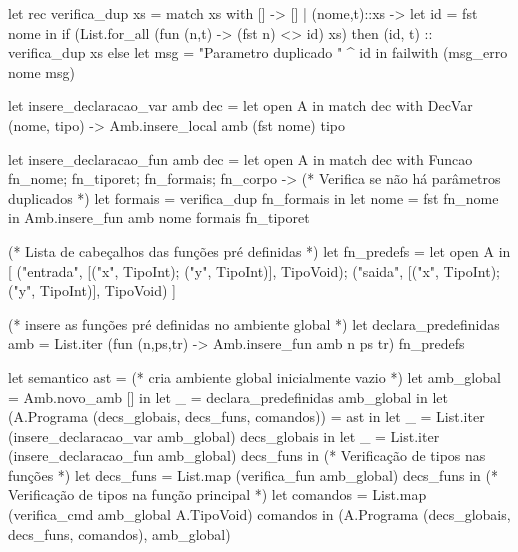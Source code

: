 \documentclass[12pt,a4paper,twoside]{article}
\begin{document}
\begin{terminal}
let rec verifica_dup xs =
  match xs with
    [] -> []
  | (nome,t)::xs ->
    let id = fst nome in
    if (List.for_all (fun (n,t) -> (fst n) <> id) xs)
    then (id, t) :: verifica_dup xs
    else let msg = "Parametro duplicado " ^ id in
      failwith (msg_erro nome msg)

let insere_declaracao_var amb dec =
  let open A in
    match dec with
        DecVar (nome, tipo) ->  Amb.insere_local amb (fst nome) tipo

let insere_declaracao_fun amb dec =
  let open A in
    match dec with
      Funcao {fn_nome; fn_tiporet; fn_formais; fn_corpo} ->
        (* Verifica se não há parâmetros duplicados *)
        let formais = verifica_dup fn_formais in
        let nome = fst fn_nome in
        Amb.insere_fun amb nome formais fn_tiporet


(* Lista de cabeçalhos das funções pré definidas *)
let fn_predefs = let open A in [
   ("entrada", [("x", TipoInt); ("y", TipoInt)], TipoVoid);
   ("saida",   [("x", TipoInt); ("y", TipoInt)], TipoVoid)
]

(* insere as funções pré definidas no ambiente global *)
let declara_predefinidas amb =
  List.iter (fun (n,ps,tr) -> Amb.insere_fun amb n ps tr) fn_predefs

let semantico ast =
  (* cria ambiente global inicialmente vazio *)
  let amb_global = Amb.novo_amb [] in
  let _ = declara_predefinidas amb_global in
  let (A.Programa (decs_globais, decs_funs, comandos)) = ast in
  let _ = List.iter (insere_declaracao_var amb_global) decs_globais in
  let _ = List.iter (insere_declaracao_fun amb_global) decs_funs in
  (* Verificação de tipos nas funções *)
  let decs_funs = List.map (verifica_fun amb_global) decs_funs in
  (* Verificação de tipos na função principal *)
  let comandos = List.map (verifica_cmd amb_global A.TipoVoid) comandos in
     (A.Programa (decs_globais, decs_funs, comandos),  amb_global)
\end{terminal}
\end{document}
